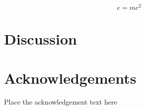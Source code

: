 \documentclass[EJ]{IAEE}
\begin{document}
\begin{equation}
\label{eq:emc}
e = mc^2
\end{equation}


\section{Discussion}


\appendixtitle %

\appendixtext{



} %


\section*{Acknowledgements}

Place the acknowledgement text here

\end{document}
